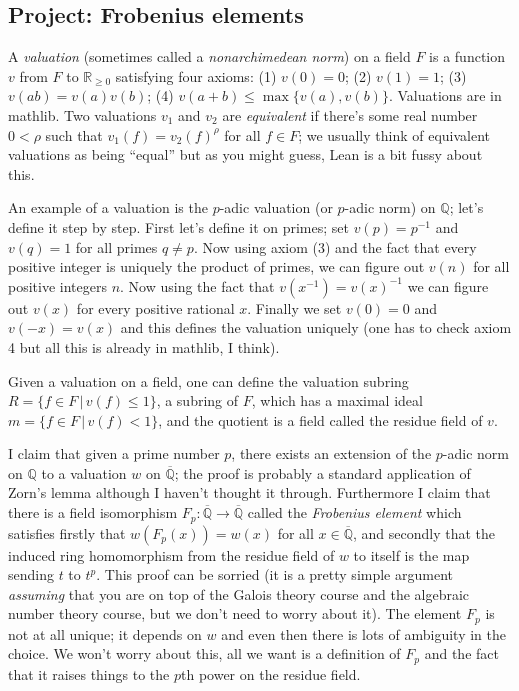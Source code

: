 \documentclass{amsart}
\newcommand{\Q}{\mathbb{Q}}
\newcommand{\R}{\mathbb{R}}
\newcommand{\Qbar}{\overline{\Q}}
\begin{document}
\subsection{Project: Frobenius elements}

A \emph{valuation} (sometimes called a \emph{nonarchimedean norm}) on a field $F$ is a function $v$ from $F$ to $\R_{\geq0}$ satisfying four axioms: (1) $v(0)=0$; (2) $v(1)=1$; (3) $v(ab)=v(a)v(b)$; (4) $v(a+b)\leq \max\{v(a),v(b)\}$. Valuations are in mathlib. Two valuations $v_1$ and $v_2$ are \emph{equivalent} if there's some real number $0<\rho$ such that $v_1(f)=v_2(f)^\rho$ for all $f\in F$; we usually think of equivalent valuations as being ``equal'' but as you might guess, Lean is a bit fussy about this.

An example of a valuation is the $p$-adic valuation (or $p$-adic norm) on $\Q$; let's define it step by step. First let's define it on primes; set $v(p)=p^{-1}$ and $v(q)=1$ for all primes $q\not=p$. Now using axiom (3) and the fact that every positive integer is uniquely the product of primes, we can figure out $v(n)$ for all positive integers $n$. Now using the fact that $v(x^{-1})=v(x)^{-1}$ we can figure out $v(x)$ for every positive rational $x$. Finally we set $v(0)=0$ and $v(-x)=v(x)$ and this defines the valuation uniquely (one has to check axiom 4 but all this is already in mathlib, I think).

Given a valuation on a field, one can define the valuation subring $R=\{f\in F\,|\,v(f)\leq 1\}$, a subring of $F$, which has a maximal ideal $m=\{f\in F\,|\,v(f)<1\}$, and the quotient is a field called the residue field of $v$.

I claim that given a prime number $p$, there exists an extension of the $p$-adic norm on $\Q$ to a valuation $w$ on $\Qbar$; the proof is probably a standard application of Zorn's lemma although I haven't thought it through. Furthermore I claim that there is a field isomorphism $F_p:\Qbar\to\Qbar$ called the \emph{Frobenius element} which satisfies firstly that $w(F_p(x))=w(x)$ for all $x\in\Qbar$, and secondly that the induced ring homomorphism from the residue field of $w$ to itself is the map sending $t$ to $t^p$. This proof can be sorried (it is a pretty simple argument \emph{assuming} that you are on top of the Galois theory course and the algebraic number theory course, but we don't need to worry about it). The element $F_p$ is not at all unique; it depends on $w$ and even then there is lots of ambiguity in the choice. We won't worry about this, all we want is a definition of $F_p$ and the fact that it raises things to the $p$th power on the residue field.
\end{document}
